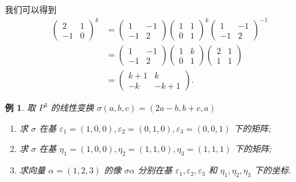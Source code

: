 \documentclass[13pt]{beamer}
\newtheorem{exa}{例}
\begin{document}
\begin{frame}


我们可以得到
\[
\begin{aligned}
\left(\begin{array}{rr}
2 & 1 \\
-1 & 0
\end{array}\right)^{k} &=\left(\begin{array}{rr}
1 & -1 \\
-1 & 2
\end{array}\right)\left(\begin{array}{rr}
1 & 1 \\
0 & 1
\end{array}\right)^{k}\left(\begin{array}{rr}
1 & -1 \\
-1 & 2
\end{array}\right)^{-1} \\
&=\left(\begin{array}{rr}
1 & -1 \\
-1 & 2
\end{array}\right)\left(\begin{array}{rr}
1 & k \\
0 & 1
\end{array}\right)\left(\begin{array}{rr}
2 & 1 \\
1 & 1
\end{array}\right) \\
&=\left( \begin{array}{cc}
k+1 & k \\
-k & -k+1
\end{array}\right).
\end{aligned}
\]

\end{frame}

\begin{frame}
\begin{exa}
	取 $P^{3}$ 的线性变换 $\sigma(a, b, c)=(2 a-b, b+c, a)$
\begin{enumerate}

\item 求 $\sigma$ 在基 $\varepsilon_{1}=(1,0,0), \varepsilon_{2}=(0,1,0), \varepsilon_{3}=(0,0,1)$ 下的矩阵;
\item 求 $\sigma$ 在基 $\eta_{1}=(1,0,0), \eta_{2}=(1,1,0), \eta_{3}=(1,1,1)$ 下的矩阵;
\item 求向量 $\alpha=(1,2,3)$ 的像 $\sigma \alpha$ 分别在基 $\varepsilon_{1}, \varepsilon_{2}, \varepsilon_{3}$ 和 $\eta_{1}, \eta_{2}, \eta_{3}$ 下的坐标.	
\end{enumerate}
\end{exa}
\end{frame}
\end{document}
